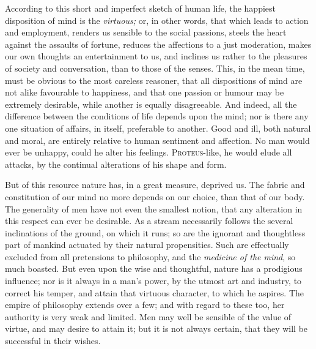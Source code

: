 According to this short and imperfect sketch of human life, the
happiest disposition of mind is the \textit{virtuous;} or, in other
words, that which leads to action and employment, renders us sensible
to the social passions, steels the heart against the assaults of
fortune, reduces the affections to a just moderation, makes our own
thoughts an entertainment to us, and inclines us rather to the
pleasures of society and conversation, than to those of the senses.
This, in the mean time, must be obvious to the most careless reasoner,
that all dispositions of mind are not alike favourable to happiness,
and that one passion or humour may be extremely desirable, while
another is equally disagreeable. And indeed, all the difference
between the conditions of life depends upon the mind; nor is there any
one situation of affairs, in itself, preferable to another. Good and
ill, both natural and moral, are entirely relative to human sentiment
and affection. No man would ever be unhappy, could he alter his
feelings. \textsc{Proteus}-like, he would elude all attacks, by the
continual alterations of his shape and form.

But of this resource nature has, in a great measure, deprived us. The
fabric and constitution of our mind no more depends on our choice,
than that of our body. The generality of men have not even the
smallest notion, that any alteration in this respect can ever be
desirable. As a stream necessarily follows the several inclinations of
the ground, on which it runs; so are the ignorant and thoughtless part
of mankind actuated by their natural propensities. Such are
effectually excluded from all pretensions to philosophy, and the
\textit{medicine of the mind}, so much boasted. But even upon the wise
and thoughtful, nature has a prodigious influence; nor is it always
 in a man's power, by the utmost art and industry, to
correct his temper, and attain that virtuous character, to which he
aspires. The empire of philosophy extends over a few; and with regard
to these too, her authority is very weak and limited. Men may well be
sensible of the value of virtue, and may desire to attain it; but it
is not always certain, that they will be successful in their wishes.

